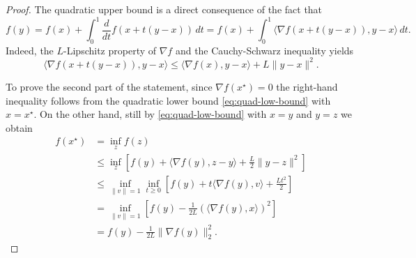      \begin{proof}
         The quadratic upper bound is a direct consequence of the fact that
         \begin{equation}
             f(y)
             =f(x)+\int_0^1 \frac{d}{dt} f(x+t(y-x)) \, dt
             =f(x)+\int_0^1 \langle\nabla f(x+t(y-x)), y-x \rangle\, dt.
         \end{equation}
         Indeed, the $L$-Lipschitz property of $\nabla f$ and the Cauchy-Schwarz inequality yields
         \begin{equation}
             \langle\nabla f(x+t(y-x)), y-x \rangle
             \le \langle\nabla f(x), y-x \rangle + L \|y-x\|^2.
         \end{equation}
 
         To prove the second part of the statement, since $\nabla f(x^\star) =0$ the right-hand inequality follows from the quadratic lower bound \eqref{eq:quad-low-bound} with $x=x^\star$. On the other hand, still by \eqref{eq:quad-low-bound} with $x=y$ and $y=z$ we obtain
         \begin{equation}
             \begin{split}
                 f(x^\star)
                  & = \inf_{z} f(z)                                                                                        \\
                  & \le \inf_z \left[ f(y) + \langle \nabla f(y), z-y \rangle + \frac{L}2 \|y-z\|^2 \right]                \\
                  & \le \inf_{\|v\|=1} \inf_{t\ge 0} \left[ f(y) + t\langle \nabla f(y), v \rangle + \frac{Lt^2}2  \right] \\
                  & = \inf_{\|v\|=1} \left[ f(y) - \frac{1}{2L} \left(\langle \nabla f(y),x\rangle\right)^2 \right]        \\
                  & = f(y) - \frac{1}{2L} \|\nabla f(y)\|_2^2.
             \end{split}
         \end{equation}
 

\end{proof}
